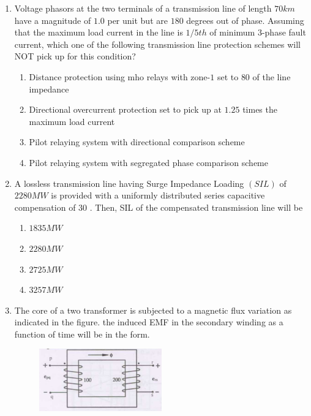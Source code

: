 \documentclass{article}
\newcommand{\brak}[1]{\left( #1 \right)}
\begin{document}
\begin{enumerate}
    \item Voltage phasors at the two terminals of a transmission line of length $70 km$ have a magnitude of $1.0$ per unit but are $180$ degrees out of phase. Assuming that the maximum load current in the line  
 is $1/5th$ of minimum $3$-phase fault current, which one of the following transmission line protection schemes will NOT pick up for this condition?  

        \begin{enumerate}
            \item Distance protection using mho relays with zone-$1$ set to $80$ of the line impedance
            \item Directional overcurrent protection set to pick up at $1.25$ times the maximum load current
            \item Pilot relaying system with directional comparison scheme
            \item Pilot relaying system with segregated phase comparison scheme
        \end{enumerate}

    \item A lossless transmission line having Surge Impedance Loading          $\brak{SIL}$ of $2280 MW$ is provided with a uniformly distributed series capacitive compensation of  
 $30$ . Then, SIL of the compensated transmission line will be  

        \begin{enumerate}
            \item $1835 MW$
            \item $2280 MW$
            \item $2725 MW$
            \item $3257 MW$
        \end{enumerate}       


     \item The core of a two transformer is subjected to a magnetic flux variation as indicated in the figure. the induced EMF in the secondary winding as a function of time will be in the form.

   \begin{figure}[h!]
    \centering
      \hspace{-1cm}
      \includegraphics[width=0.5\textwidth]{Screenshot from 2024-10-26 12-11-33.png}
      

\end{figure}
\end{enumerate}
\end{document}
